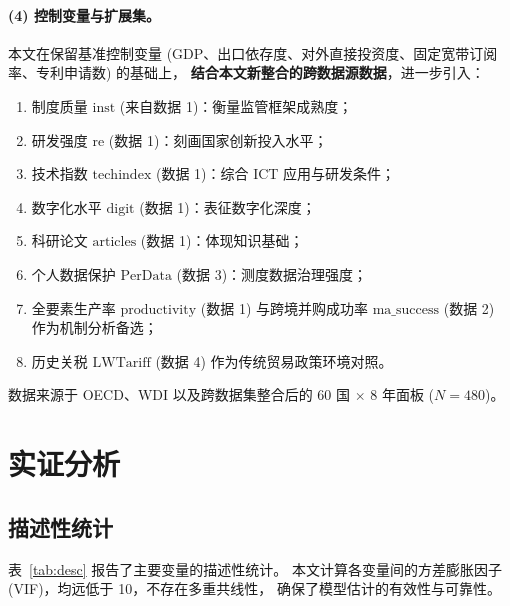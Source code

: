 \documentclass[11pt,a4paper]{article}
\begin{document}
\paragraph{(4) 控制变量与扩展集。}
本文在保留基准控制变量 (GDP、出口依存度、对外直接投资度、固定宽带订阅率、专利申请数) 的基础上，
\textbf{结合本文新整合的跨数据源数据}，进一步引入：
\begin{enumerate}[label=(\alph*),leftmargin=2em]
\item 制度质量 $\mathrm{inst}$ (来自数据 1)：衡量监管框架成熟度；
\item 研发强度 $\mathrm{re}$ (数据 1)：刻画国家创新投入水平；
\item 技术指数 $\mathrm{techindex}$ (数据 1)：综合 ICT 应用与研发条件；
\item 数字化水平 $\mathrm{digit}$ (数据 1)：表征数字化深度；
\item 科研论文 $\mathrm{articles}$ (数据 1)：体现知识基础；
\item 个人数据保护 $\mathrm{PerData}$ (数据 3)：测度数据治理强度；
\item 全要素生产率 $\mathrm{productivity}$ (数据 1) 与跨境并购成功率 $\mathrm{ma\_success}$ (数据 2) 作为机制分析备选；
\item 历史关税 $\mathrm{LWTariff}$ (数据 4) 作为传统贸易政策环境对照。
\end{enumerate}
数据来源于 OECD、WDI 以及跨数据集整合后的 60 国 $\times$ 8 年面板 ($N=480$)。

\section{实证分析}

\subsection{描述性统计}

表~\ref{tab:desc} 报告了主要变量的描述性统计。
本文计算各变量间的方差膨胀因子 (VIF)，均远低于 10，不存在多重共线性，
确保了模型估计的有效性与可靠性。
\end{document}
